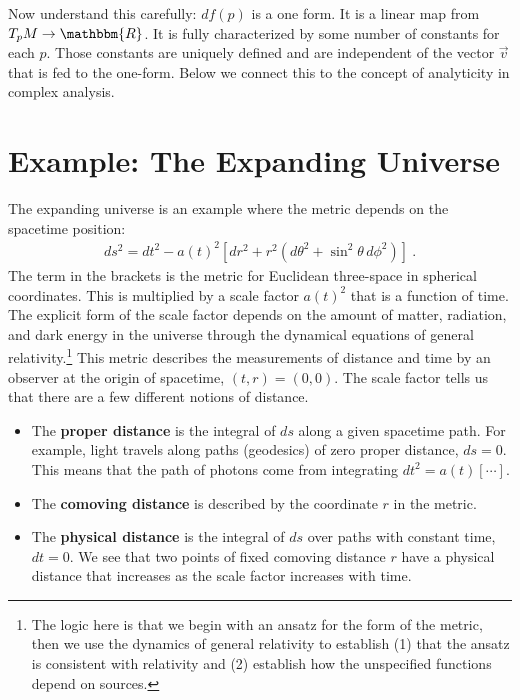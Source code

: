 \documentclass[
  11pt,
	colorful,
	raggedright,
]{tufte-style-thesis-flip}
\begin{document}
Now understand this carefully: $df(p)$ is a one form. It is a linear map from $T_pM \to \mathbbm{R}$. It is fully characterized by some number of constants for each $p$. Those constants are uniquely defined and are independent of the vector $\vec{v}$ that is fed to the one-form. Below we connect this to the concept of analyticity in complex analysis.

\section{Example: The Expanding Universe}
\label{sec:FRW}

The expanding universe is an example where the metric depends on the spacetime position:
\begin{align}
  ds^2 = dt^2 - a(t)^2 \left[dr^2 + r^2\left(d\theta^2 + \sin^2\theta\, d\phi^2\right) \right] \ .
\end{align}
The term in the brackets is the metric for Euclidean three-space in spherical coordinates. This is multiplied by a scale factor $a(t)^2$ that is a function of time. The explicit form of the scale factor depends on the amount of matter, radiation, and dark energy in the universe through the dynamical equations of general relativity.\footnote{The logic here is that we begin with an ansatz for the form of the metric, then we use the dynamics of general relativity to establish (1) that the ansatz is consistent with relativity and  (2) establish how the unspecified functions depend on sources.} This metric describes the measurements of distance and time by an observer at the origin of spacetime, $(t,r)=(0,0)$. The scale factor tells us that there are a few different notions of distance. 

\begin{itemize}
  \item The \textbf{proper distance} is the integral of $ds$ along a given spacetime path. For example, light travels along paths (geodesics) of zero proper distance, $ds=0$. This means that the path of photons come from integrating $dt^2 = a(t)\left[\cdots\right]$.
  \item The \textbf{comoving distance} is described by the coordinate $r$ in the metric. 
  \item The \textbf{physical distance} is the integral of $ds$ over paths with constant time, $dt=0$. We see that two points of fixed comoving distance $r$ have a physical distance that increases as the scale factor increases with time.
\end{itemize}
\end{document}
